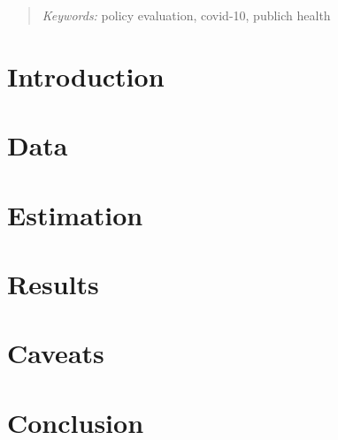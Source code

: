 \documentclass[12pt]{article}
\begin{document}
\maketitle
\begin{abstract}


\emph{Keywords:} policy evaluation, covid-10, publich health
\end{abstract}
\section{Introduction}

\section{Data}\label{sec:data}

\section{Estimation}\label{sec:estimation}

\section{Results}\label{sec:results}

\section{Caveats}\label{seci:caveats}

\section{Conclusion}\label{seci:conclusion}

\clearpage\printbibliography
\appendix\clearpage

\end{document}
